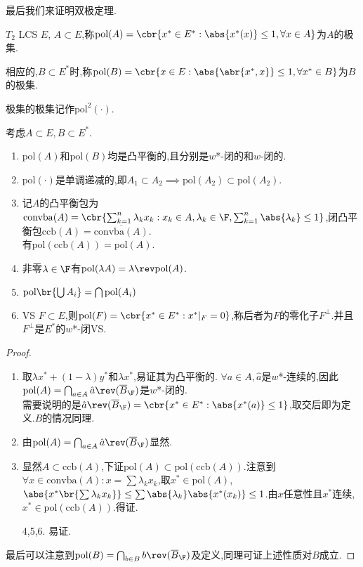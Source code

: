 \documentclass{article}
\begin{document}
最后我们来证明双极定理.
\begin{definition}
    $T_2$ LCS $E$, $A\subset E$,称$\mathrm{pol}(A)=\cbr{x^*\in E^*:\abs{x^*(x)}\leq 1,\forall x\in A}$为$A$的极集.
    
    相应的,$B\subset E^*$时,称$\mathrm{pol}(B)=\cbr{x\in E:\abs{\abr{x^*,x}}\leq 1,\forall x^*\in B}$为$B$的极集.

    极集的极集记作$\mathrm{pol}^2(\cdot)$.
\end{definition}
\begin{proposition}考虑$A\subset E,B\subset E^*$.
    \begin{enumerate}
        \item $\mathrm{pol}(A)$和$\mathrm{pol}(B)$均是凸平衡的,且分别是$w$*-闭的和$w$-闭的.
        \item $\mathrm{pol}(\cdot)$是单调递减的,即$A_1\subset A_2\implies \mathrm{pol}(A_2)\subset \mathrm{pol}(A_2)$.
        \item 记$A$的凸平衡包为$\mathrm{convba}(A)=\cbr{\sum_{k=1}^n \lambda_kx_k:x_k\in A,\lambda_k\in \F,\sum_{k=1}^n \abs{\lambda_k}\leq 1}$,闭凸平衡包$\mathrm{ccb}(A)=\overline{\mathrm{convba}(A)}$.\\有$\mathrm{pol}(\mathrm{ccb}(A))=\mathrm{pol}(A)$.
        \item 非零$\lambda\in \F$有$\mathrm{pol}(\lambda A)=\lambda\rev\mathrm{pol}(A)$.
        \item $\mathrm{pol}\br{\bigcup A_i}=\bigcap \mathrm{pol}(A_i)$
        \item VS $F\subset E$,则$\mathrm{pol}(F)=\cbr{x^*\in E^*:x^*|_F=0}$,称后者为$F$的零化子$F^{\perp}$.并且$F^{\perp}$是$E^*$的$w$*-闭VS.
    \end{enumerate}
\end{proposition}
\begin{proof}
    \begin{enumerate}
        \item 取$\lambda x^*+(1-\lambda)y^*$和$\lambda x^*$,易证其为凸平衡的.
        $\forall a\in A,\hat{a}$是$w$*-连续的,因此$\mathrm{pol}(A)=\bigcap_{a\in A}\hat{a}\rev(\overline{B}_\F)$是$w$*-闭的.\\
        需要说明的是$\hat{a}\rev(\overline{B}_\F)=\cbr{x^*\in E^*:\abs{x^*(a)}\leq 1}$,取交后即为定义.$B$的情况同理.
        \item 由$\mathrm{pol}(A)=\bigcap_{a\in A}\hat{a}\rev(\overline{B}_\F)$显然.
        \item 显然$A\subset \mathrm{ccb}(A)$,下证$\mathrm{pol}(A)\subset \mathrm{pol}(\mathrm{ccb}(A))$.注意到$\forall x\in \mathrm{convba}(A):x=\sum \lambda_kx_k$,取$x^*\in \mathrm{pol}(A)$,\\$\abs{x^*\br{\sum \lambda_kx_k}}\leq \sum \abs{\lambda_k}\abs{x^*(x_k)}\leq 1$.由$x$任意性且$x^*$连续,$x^*\in \mathrm{pol}(\mathrm{ccb}(A))$.得证.
        \item[4,5,6.] 易证.
    \end{enumerate}
    最后可以注意到$\mathrm{pol}(B)=\bigcap_{b\in B}b\rev (\overline{B}_\F)$及定义,同理可证上述性质对$B$成立.
\end{proof}
\end{document}
